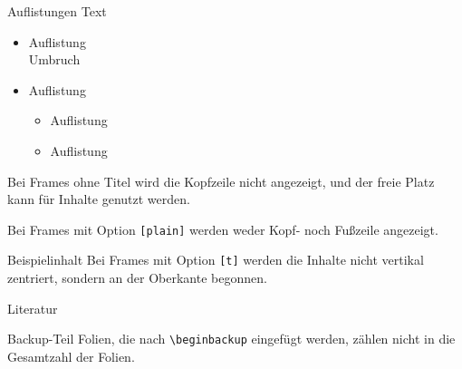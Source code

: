 \documentclass{sdqbeamer}
\begin{document}
\begin{frame}{Auflistungen}
  Text
  \begin{itemize}
    \item Auflistung\\ Umbruch
    \item Auflistung
    \begin{itemize}
      \item Auflistung
      \item Auflistung
    \end{itemize}
  \end{itemize}
\end{frame}


\begin{frame}
        Bei Frames ohne Titel wird die Kopfzeile nicht angezeigt, und  
    der freie Platz kann für Inhalte genutzt werden.
\end{frame}

\begin{frame}[plain]
    Bei Frames mit Option \texttt{[plain]} werden weder Kopf- noch Fußzeile angezeigt.
\end{frame}

\begin{frame}[t]{Beispielinhalt}
    Bei Frames mit Option \texttt{[t]} werden die Inhalte nicht vertikal zentriert, sondern an der Oberkante begonnen.
\end{frame}


\begin{frame}{Literatur}
  \begin{exampleblock}{Backup-Teil}
      Folien, die nach \texttt{\textbackslash beginbackup} eingefügt werden, zählen nicht in die Gesamtzahl der Folien.
  \end{exampleblock}

  \printbibliography
\end{frame}
\end{document}
